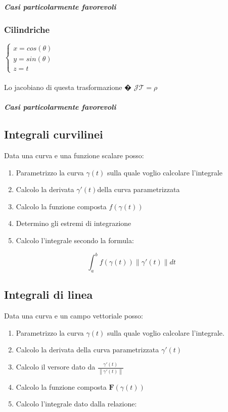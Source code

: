 \documentclass[10pt,a4paper]{report}
\newcommand{\norm}[1]{ \left\lVert {#1} \right\rVert}
\begin{document}
				\subparagraph{Casi particolarmente favorevoli}
				
				
			\subsubsection{Cilindriche}
			$ \begin{cases} 
			x=cos(\theta) \\ 
			y=sin(\theta) \\
			z=t
			\end{cases} $
			\\ \\
			Lo jacobiano di questa trasformazione � $ \mathcal{J} \mathcal{T} =\rho $
			
				\subparagraph{Casi particolarmente favorevoli}
		

		\subsection*{Integrali \textbf{curvilinei}}
			Data una curva e una funzione scalare posso:
			\begin{enumerate}
				\item Parametrizzo la curva $ \gamma(t) $ sulla quale voglio calcolare l'integrale 
				\item Calcolo la derivata $ \gamma ' (t) $della curva parametrizzata 
				\item Calcolo la funzione composta $ f(\gamma (t)) $
				\item Determino gli estremi di integrazione
				\item Calcolo l'integrale secondo la formula:
			\end{enumerate}
		
		\[ \int_{a}^{b} f(\gamma (t)) \norm{\gamma '(t)} dt\]
		
		
		\subsection*{Integrali di \textbf{linea}}
		Data una curva e un campo vettoriale posso:
			\begin{enumerate}
				\item Parametrizzo la curva $ \gamma(t) $ sulla quale voglio calcolare l'integrale. 
				\item Calcolo la derivata della curva parametrizzata $ \gamma ' (t) $
				\item Calcolo il versore dato da $ \frac{\gamma '(t)}{\norm{\gamma '(t)}} $
				\item Calcolo la funzione composta $ \mathbf{F}(\gamma (t)) $
				\item Calcolo l'integrale dato dalla relazione:
				\end{enumerate}
			
\end{document}
